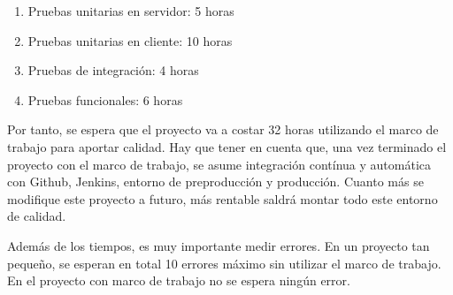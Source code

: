 \begin{enumerate}
  \item Pruebas unitarias en servidor: 5 horas
  \item Pruebas unitarias en cliente: 10 horas
  \item Pruebas de integración: 4 horas
  \item Pruebas funcionales: 6 horas
\end{enumerate}

Por tanto, se espera que el proyecto va a costar 32 horas utilizando el marco de trabajo para aportar calidad. Hay que tener en cuenta que, una vez terminado el proyecto con el marco de trabajo, se asume integración contínua y automática con Github, Jenkins, entorno de preproducción y producción. Cuanto más se modifique este proyecto a futuro, más rentable saldrá montar todo este entorno de calidad.

Además de los tiempos, es muy importante medir errores. En un proyecto tan pequeño, se esperan en total 10 errores máximo sin utilizar el marco de trabajo. En el proyecto con marco de trabajo no se espera ningún error.
